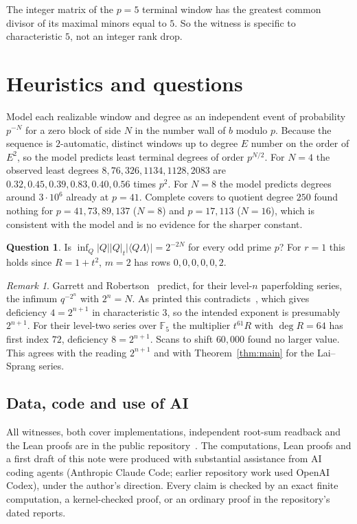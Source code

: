 \documentclass[11pt]{amsart}
\theoremstyle{definition}
\newtheorem{question}[theorem]{Question}
\theoremstyle{remark}
\newtheorem{remark}[theorem]{Remark}
\newcommand{\F}{\mathbb{F}}
\newcommand{\abs}[1]{\left|#1\right|}
\newcommand{\frp}[1]{\langle #1\rangle}
\begin{document}
The integer matrix of the $p=5$ terminal window has the greatest common divisor
of its maximal minors equal to $5$. So the witness is specific to
characteristic $5$, not an integer rank drop.

\section{Heuristics and questions}

Model each realizable window and degree as an independent event of
probability $p^{-N}$ for a zero block of side $N$ in the number wall of $b$
modulo $p$. Because the sequence is $2$-automatic, distinct windows up to
degree $E$ number on the order of $E^2$, so the model predicts least terminal
degrees of order $p^{N/2}$. For $N=4$ the observed least degrees
$8,76,326,1134,1128,2083$ are $0.32,0.45,0.39,0.83,0.40,0.56$ times $p^2$. For $N=8$ the model predicts
degrees around $3\cdot10^6$ already at $p=41$. Complete covers to quotient
degree $250$ found nothing for $p=41,73,89,137$ ($N=8$) and $p=17,113$
($N=16$), which is consistent with the model and is no evidence for the
sharper constant.

\begin{question}
Is $\inf_Q\abs{Q}\abs{Q}_t\abs{\frp{Q\Lambda}}=2^{-2N}$ for every odd prime
$p$? For $r=1$ this holds since $R=1+t^2$, $m=2$ has rows $0,0,0,0,0,2$.
\end{question}

\begin{remark}
Garrett and Robertson~\cite[Conjecture~1.8]{GR} predict, for their level-$n$
paperfolding series, the infimum $q^{-2^n}$ with $2^n=N$. As printed this
contradicts~\cite[Theorem~1.1]{ANL}, which gives deficiency $4=2^{n+1}$ in
characteristic $3$, so the intended exponent is presumably $2^{n+1}$. For
their level-two series over $\F_5$ the multiplier $t^{61}R$ with $\deg R=64$
has first index $72$, deficiency $8=2^{n+1}$. Scans to shift $60{,}000$ found
no larger value. This agrees with the reading $2^{n+1}$ and with
Theorem~\ref{thm:main} for the Lai--Sprang series.
\end{remark}

\subsection*{Data, code and use of AI}
All witnesses, both cover implementations, independent root-sum readback and
the Lean proofs are in the public repository~\cite{repo}. The computations,
Lean proofs and a first draft of this note were produced with substantial
assistance from AI coding agents (Anthropic Claude Code; earlier repository
work used OpenAI Codex), under the author's direction. Every claim is checked
by an exact finite computation, a kernel-checked proof, or an ordinary proof
in the repository's dated reports.
\end{document}
